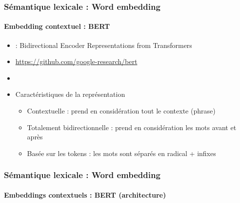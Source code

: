 \documentclass[xcolor=table]{beamer}
\begin{document}
\begin{frame}
\frametitle{Sémantique lexicale : Word embedding}
\framesubtitle{Embedding contextuel : BERT}

\begin{minipage}{.68\textwidth}
	\begin{itemize}
		\item {} : Bidirectional Encoder Representations from Transformers
		\item \url{https://github.com/google-research/bert}
		\item \cite{2019-devlin-al}
		\item Caractéristiques de la représentation
		\begin{itemize}
			\item Contextuelle :  prend en considération tout le contexte (phrase)
			\item Totalement bidirectionnelle : prend en considération les mots avant et après 
			\item Basée sur les tokens : les mots sont séparés en radical + infixes
		\end{itemize}
	\end{itemize}
\end{minipage}
\begin{minipage}{.3\textwidth}
	\vspace{.5cm}
\end{minipage}
	
\end{frame}

\begin{frame}
\frametitle{Sémantique lexicale : Word embedding}
\framesubtitle{Embeddings contextuels : BERT (architecture)}
	
	
\end{frame}
\end{document}
